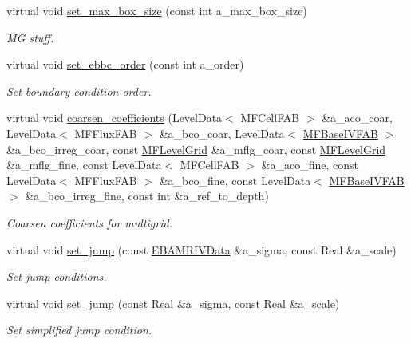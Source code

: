 \begin{DoxyCompactItemize}
virtual void \hyperlink{classnwomfconductivityopfactory_a23c7f4ed432c263cbbc3214e830a4110}{set\+\_\+max\+\_\+box\+\_\+size} (const int a\+\_\+max\+\_\+box\+\_\+size)
\begin{DoxyCompactList}\small\item\em MG stuff. \end{DoxyCompactList}\item 
virtual void \hyperlink{classnwomfconductivityopfactory_abcc428a2da631f2467070bc1d0125c60}{set\+\_\+ebbc\+\_\+order} (const int a\+\_\+order)
\begin{DoxyCompactList}\small\item\em Set boundary condition order. \end{DoxyCompactList}\item 
virtual void \hyperlink{classnwomfconductivityopfactory_a185a8d29e530d4348ab3c1de703b829c}{coarsen\+\_\+coefficients} (Level\+Data$<$ M\+F\+Cell\+F\+AB $>$ \&a\+\_\+aco\+\_\+coar, Level\+Data$<$ M\+F\+Flux\+F\+AB $>$ \&a\+\_\+bco\+\_\+coar, Level\+Data$<$ \hyperlink{classMFBaseIVFAB}{M\+F\+Base\+I\+V\+F\+AB} $>$ \&a\+\_\+bco\+\_\+irreg\+\_\+coar, const \hyperlink{classMFLevelGrid}{M\+F\+Level\+Grid} \&a\+\_\+mflg\+\_\+coar, const \hyperlink{classMFLevelGrid}{M\+F\+Level\+Grid} \&a\+\_\+mflg\+\_\+fine, const Level\+Data$<$ M\+F\+Cell\+F\+AB $>$ \&a\+\_\+aco\+\_\+fine, const Level\+Data$<$ M\+F\+Flux\+F\+AB $>$ \&a\+\_\+bco\+\_\+fine, const Level\+Data$<$ \hyperlink{classMFBaseIVFAB}{M\+F\+Base\+I\+V\+F\+AB} $>$ \&a\+\_\+bco\+\_\+irreg\+\_\+fine, const int \&a\+\_\+ref\+\_\+to\+\_\+depth)
\begin{DoxyCompactList}\small\item\em Coarsen coefficients for multigrid. \end{DoxyCompactList}\item 
virtual void \hyperlink{classnwomfconductivityopfactory_ad1f2e01d2e2f0029c29a2473b0d41c9a}{set\+\_\+jump} (const \hyperlink{type__definitions_8H_a6b8fa905d55cbb491b52180386f0e0c1}{E\+B\+A\+M\+R\+I\+V\+Data} \&a\+\_\+sigma, const Real \&a\+\_\+scale)
\begin{DoxyCompactList}\small\item\em Set jump conditions. \end{DoxyCompactList}\item 
virtual void \hyperlink{classnwomfconductivityopfactory_ad406a96c9c3d10e8f9039dd543c19fd2}{set\+\_\+jump} (const Real \&a\+\_\+sigma, const Real \&a\+\_\+scale)
\begin{DoxyCompactList}\small\item\em Set simplified jump condition. \end{DoxyCompactList}\item 

\end{DoxyCompactItemize}
